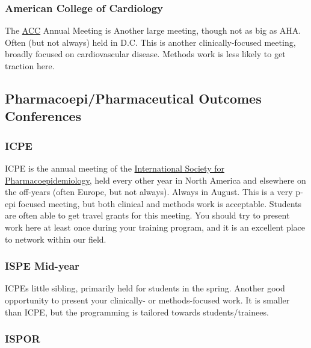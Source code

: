 \documentclass[
  letterpaper,
  DIV=11,
  numbers=noendperiod]{scrreprt}
\begin{document}
\hypertarget{american-college-of-cardiology}{%
\subsubsection{American College of
Cardiology}\label{american-college-of-cardiology}}

The \href{https://www.acc.org/}{ACC} Annual Meeting is Another large
meeting, though not as big as AHA. Often (but not always) held in D.C.
This is another clinically-focused meeting, broadly focused on
cardiovascular disease. Methods work is less likely to get traction
here.

\hypertarget{pharmacoepipharmaceutical-outcomes-conferences}{%
\subsection{Pharmacoepi/Pharmaceutical Outcomes
Conferences}\label{pharmacoepipharmaceutical-outcomes-conferences}}

\hypertarget{icpe}{%
\subsubsection{ICPE}\label{icpe}}

ICPE is the annual meeting of the
\href{https://pharmacoepi.org/}{International Society for
Pharmacoepidemiology}, held every other year in North America and
elsewhere on the off-years (often Europe, but not always). Always in
August. This is a very p-epi focused meeting, but both clinical and
methods work is acceptable. Students are often able to get travel grants
for this meeting. You should try to present work here at least once
during your training program, and it is an excellent place to network
within our field.

\hypertarget{ispe-mid-year}{%
\subsubsection{ISPE Mid-year}\label{ispe-mid-year}}

ICPEs little sibling, primarily held for students in the spring. Another
good opportunity to present your clinically- or methods-focused work. It
is smaller than ICPE, but the programming is tailored towards
students/trainees.

\hypertarget{ispor}{%
\subsubsection{ISPOR}\label{ispor}}
\end{document}
